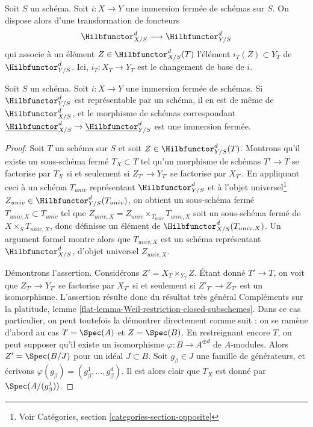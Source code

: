 \noindent
Soit $S$ un schéma. Soit $i : X \to Y$ une immersion fermée de schémas
sur $S$. On dispose alors d'une transformation de foncteurs
$$
\Hilbfunctor^d_{X/S} \longrightarrow \Hilbfunctor^d_{Y/S}
$$
qui associe à un élément $Z \in \Hilbfunctor^d_{X/S}(T)$
l'élément $i_T(Z) \subset Y_T$ de $\Hilbfunctor^d_{Y/S}$. Ici, $i_T : X_T \to Y_T$
est le changement de base de $i$.

\begin{lemma}
\label{lemma-hilb-d-of-closed}
Soit $S$ un schéma. Soit $i : X \to Y$ une immersion fermée de schémas.
Si $\Hilbfunctor^d_{Y/S}$ est représentable par un schéma, il en est de même de
$\Hilbfunctor^d_{X/S}$, et le morphisme de schémas correspondant
$\underline{\Hilbfunctor}^d_{X/S} \to \underline{\Hilbfunctor}^d_{Y/S}$
est une immersion fermée.
\end{lemma}

\begin{proof}
Soit $T$ un schéma sur $S$ et soit $Z \in \Hilbfunctor^d_{Y/S}(T)$.
Montrons qu'il existe un sous-schéma fermé $T_X \subset T$ tel
qu'un morphisme de schémas $T' \to T$ se factorise par $T_X$ si
et seulement si $Z_{T'} \to Y_{T'}$ se factorise par $X_{T'}$.
En appliquant ceci à un schéma $T_{univ}$ représentant $\Hilbfunctor^d_{Y/S}$ et à
l'objet universel\footnote{Voir
Catégories, section \ref{categories-section-opposite}}
$Z_{univ} \in \Hilbfunctor^d_{Y/S}(T_{univ})$,
on obtient un sous-schéma fermé $T_{univ, X} \subset T_{univ}$ tel que
$Z_{univ, X} = Z_{univ} \times_{T_{univ}} T_{univ, X}$
soit un sous-schéma fermé de $X \times_S T_{univ, X}$, donc
définisse un élément de $\Hilbfunctor^d_{X/S}(T_{univ, X})$.
Un argument formel montre alors que $T_{univ, X}$ est un schéma
représentant $\Hilbfunctor^d_{X/S}$, d'objet universel $Z_{univ, X}$.

\medskip\noindent
Démontrons l'assertion. Considérons $Z' = X_T \times_{Y_T} Z$. Étant donné $T' \to T$,
on voit que $Z_{T'} \to Y_{T'}$ se factorise par $X_{T'}$ si et
seulement si $Z'_{T'} \to Z_{T'}$ est un isomorphisme. L'assertion résulte donc
du résultat très général
Compléments sur la platitude, lemme \ref{flat-lemma-Weil-restriction-closed-subschemes}.
Dans ce cas particulier, on peut toutefois la démontrer directement comme
suit : on se ramène d'abord au cas $T = \Spec(A)$ et $Z = \Spec(B)$.
En restreignant encore $T$, on peut supposer qu'il existe un isomorphisme
$\varphi : B \to A^{\oplus d}$ de $A$-modules. Alors $Z' = \Spec(B/J)$
pour un idéal $J \subset B$. Soit $g_\beta \in J$ une famille de
générateurs, et écrivons $\varphi(g_\beta) = (g_\beta^1, \ldots, g_\beta^d)$.
Il est alors clair que $T_X$ est donné par $\Spec(A/(g_\beta^j))$.
\end{proof}

